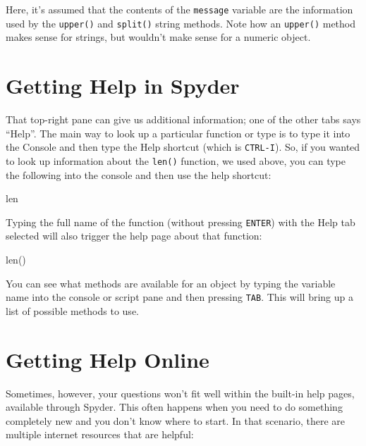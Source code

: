 \documentclass[]{Nemilov}
\newenvironment{Shaded}{\begin{snugshade}}{\end{snugshade}}
\newcommand{\BuiltInTok}[1]{#1}
\newcommand{\NormalTok}[1]{#1}
\begin{document}
Here, it's assumed that the contents of the \texttt{message} variable are the
information used by the \texttt{upper()} and \texttt{split()} string methods. Note how
an \texttt{upper()} method makes sense for strings, but wouldn't make sense for
a numeric object.

\hypertarget{py-getting-started-spyder-help}{%
\section{Getting Help in Spyder}\label{py-getting-started-spyder-help}}

That top-right pane can give us additional information; one of
the other tabs says ``Help''. The main way to look up a particular function
or type is to type it into the Console and then type the Help shortcut (which
is \texttt{CTRL-I}). So, if you wanted to look up information about the \texttt{len()}
function, we used above, you can type the following into the console and
then use the help shortcut:

\begin{Shaded}
\begin{Highlighting}[]
\BuiltInTok{len}
\end{Highlighting}
\end{Shaded}

Typing the full name of the function (without pressing \texttt{ENTER})
with the Help tab selected will also
trigger the help page about that function:

\begin{Shaded}
\begin{Highlighting}[]
\BuiltInTok{len}\NormalTok{()}
\end{Highlighting}
\end{Shaded}

You can see what methods are available for an object by typing the variable
name into the console or script pane and then pressing \texttt{TAB}. This will bring
up a list of possible methods to use.

\hypertarget{py-getting-started-web-help}{%
\section{Getting Help Online}\label{py-getting-started-web-help}}

Sometimes, however, your questions won't fit well within the built-in help pages,
available through Spyder. This often happens when you need to do something
completely new and you don't know where to start. In that scenario, there are
multiple internet resources that are helpful:
\end{document}
